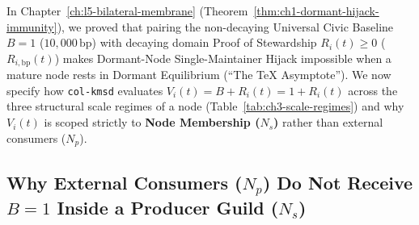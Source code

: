 In Chapter~\ref{ch:l5-bilateral-membrane} (Theorem~\ref{thm:ch1-dormant-hijack-immunity}), we
proved that pairing the non-decaying Universal Civic Baseline $B = 1$ ($10{,}000\,\mathrm{bp}$)
with decaying domain Proof of Stewardship $R_i(t) \ge 0$ ($R_{i,\mathrm{bp}}(t)$) makes
Dormant-Node Single-Maintainer Hijack impossible when a mature node rests in Dormant Equilibrium
(``The \TeX{} Asymptote''). We now specify how \texttt{col-kmsd} evaluates
$V_i(t) = B + R_i(t) = 1 + R_i(t)$ across the three structural scale regimes of a node
(Table~\ref{tab:ch3-scale-regimes}) and why $V_i(t)$ is scoped strictly to \textbf{Node Membership
($N_s$)} rather than external consumers ($N_p$).

\begin{table}[htbp]
\centering
\caption{Behavior of $V_i(t) = B + R_i(t) = 1 + R_i(t)$ Across the Three Universal Scale Regimes}
\label{tab:ch3-scale-regimes}
\footnotesize
{}
\end{table}

\subsection{Why External Consumers ($N_p$) Do Not Receive $B=1$ Inside a Producer Guild ($N_s$)}

